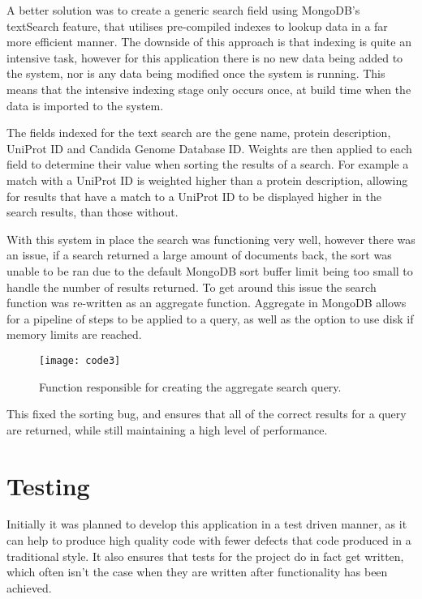 A better solution was to create a generic search field using MongoDB's textSearch\cite{textsearch} feature, that utilises pre-compiled indexes to lookup data in a far more efficient manner. The downside of this approach is that indexing is quite an intensive task, however for this application there is no new data being added to the system, nor is any data being modified once the system is running. This means that the intensive indexing stage only occurs once, at build time when the data is imported to the system.

The fields indexed for the text search are the gene name, protein description, UniProt ID and Candida Genome Database ID. Weights are then applied to each field to determine their value when sorting the results of a search. For example a match with a UniProt ID is weighted higher than a protein description, allowing for results that have a match to a UniProt ID to be displayed higher in the search results, than those without.

With this system in place the search was functioning very well, however there was an issue, if a search returned a large amount of documents back, the sort was unable to be ran due to the default MongoDB sort buffer limit being too small to handle the number of results returned. To get around this issue the search function was re-written as an aggregate function. Aggregate\cite{aggregate} in MongoDB allows for a pipeline of steps to be applied to a query, as well as the option to use disk if memory limits are reached. 

\begin{figure}[H]
\begin{center}
\texttt{[image: code3]}
\caption{Function responsible for creating the aggregate search query. \label{overflow}}
\end{center}
\end{figure}

This fixed the sorting bug, and ensures that all of the correct results for a query are returned, while still maintaining a high level of performance. 

\section{Testing}
Initially it was planned to develop this application in a test driven manner, as it can help to produce high quality code with fewer defects that code produced in a traditional style.\cite{tdd} It also ensures that tests for the project do in fact get written, which often isn't the case when they are written after functionality has been achieved. 

